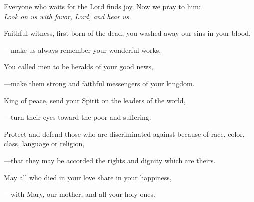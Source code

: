 \intercessions\indent

\begin{hangpar}

Everyone who waits for the Lord finds joy. Now we pray to him:\\
\emph{Look on us with favor, Lord, and hear us.}

\medskip Faithful witness, first-born of the dead, you washed away our sins in your blood,

{\color{red}---\thinspace}make us always remember your wonderful works.

\medskip You called men to be heralds of your good news,

{\color{red}---\thinspace}make them strong and faithful messengers of your kingdom.

\medskip King of peace, send your Spirit on the leaders of the world,

{\color{red}---\thinspace}turn their eyes toward the poor and suffering.

\medskip Protect and defend those who are discriminated against because of race, color, class, language or religion,

{\color{red}---\thinspace}that they may be accorded the rights and dignity which are theirs.

\medskip May all who died in your love share in your happiness,

{\color{red}---\thinspace}with Mary, our mother, and all your holy ones.

\end{hangpar}


